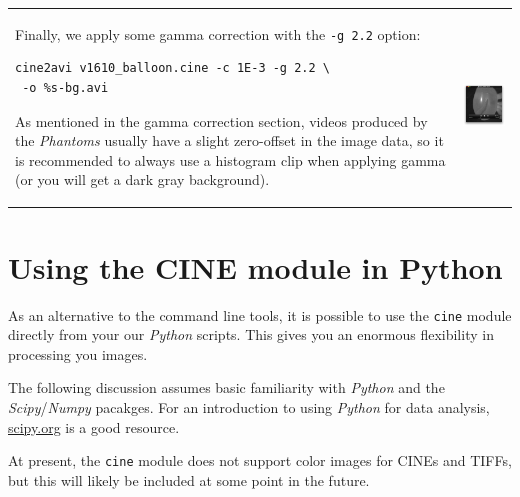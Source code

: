 \documentclass[11pt]{amsart}
\begin{document}
\begin{tabular}{p{4in}p{2in}}
\\
Finally, we apply some gamma correction with the \texttt{-g 2.2} option:
\vspace{0.5cm}
\begin{verbatim}
cine2avi v1610_balloon.cine -c 1E-3 -g 2.2 \
 -o %s-bg.avi
\end{verbatim}
\vspace{0.5cm}
As mentioned in the gamma correction section, videos produced by the \emph{Phantoms} usually have a slight zero-offset in the image data, so it is recommended to always use a histogram clip when applying gamma (or you will get a dark gray background).
&
\vspace{-10pt}\includegraphics[width=2in]{figures/cine2avi_bg.png}
\end{tabular}

\vfill \pagebreak
\section{Using the CINE module in Python}
As an alternative to the command line tools, it is possible to use the \texttt{cine} module directly from your our \emph{Python} scripts.
This gives you an enormous flexibility in processing you images.

The following discussion assumes basic familiarity with \emph{Python} and the \emph{Scipy}/\emph{Numpy} pacakges.
For an introduction to using \emph{Python} for data analysis, \href{http://scipy.org/Getting_Started}{scipy.org} is a good resource.

At present, the \texttt{cine} module does not support color images for CINEs and TIFFs, but this will likely be included at some point in the future.
\end{document}
